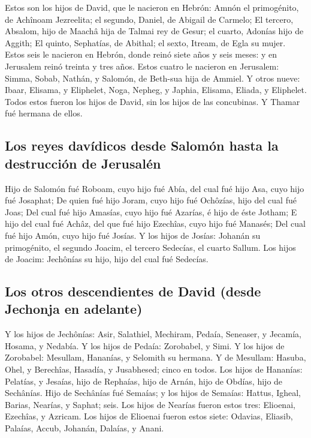  Estos son los hijos de David, que le nacieron en Hebrón:
Amnón el primogénito, de Achînoam Jezreelita; el segundo, Daniel, de
Abigail de Carmelo;  El tercero, Absalom, hijo de Maachâ
hija de Talmai rey de Gesur; el cuarto, Adonías hijo de Aggith;
 El quinto, Sephatías, de Abithal; el sexto, Itream, de
Egla su mujer.  Estos seis le nacieron en Hebrón, donde
reinó siete años y seis meses: y en Jerusalem reinó treinta y tres años.
 Estos cuatro le nacieron en Jerusalem: Simma, Sobab,
Nathán, y Salomón, de Beth-sua hija de Ammiel.  Y otros
nueve: Ibaar, Elisama, y Eliphelet,  Noga, Nepheg, y
Japhia,  Elisama, Eliada, y Eliphelet. 
Todos estos fueron los hijos de David, sin los hijos de las concubinas.
Y Thamar fué hermana de ellos.

\hypertarget{los-reyes-davuxeddicos-desde-salomuxf3n-hasta-la-destrucciuxf3n-de-jerusaluxe9n}{%
\subsection{Los reyes davídicos desde Salomón hasta la destrucción de
Jerusalén}\label{los-reyes-davuxeddicos-desde-salomuxf3n-hasta-la-destrucciuxf3n-de-jerusaluxe9n}}

 Hijo de Salomón fué Roboam, cuyo hijo fué Abía, del cual
fué hijo Asa, cuyo hijo fué Josaphat;  De quien fué hijo
Joram, cuyo hijo fué Ochôzías, hijo del cual fué Joas; 
Del cual fué hijo Amasías, cuyo hijo fué Azarías, é hijo de éste Jotham;
 E hijo del cual fué Achâz, del que fué hijo Ezechîas,
cuyo hijo fué Manasés;  Del cual fué hijo Amón, cuyo hijo
fué Josías.  Y los hijos de Josías: Johanán su
primogénito, el segundo Joacim, el tercero Sedecías, el cuarto Sallum.
 Los hijos de Joacim: Jechônías su hijo, hijo del cual
fué Sedecías.

\hypertarget{los-otros-descendientes-de-david-desde-jechonja-en-adelante}{%
\subsection{Los otros descendientes de David (desde Jechonja en
adelante)}\label{los-otros-descendientes-de-david-desde-jechonja-en-adelante}}

 Y los hijos de Jechônías: Asir, Salathiel,
 Mechiram, Pedaía, Seneaser, y Jecamía, Hosama, y
Nedabía.  Y los hijos de Pedaía: Zorobabel, y Simi. Y los
hijos de Zorobabel: Mesullam, Hananías, y Selomith su hermana.
 Y de Mesullam: Hasuba, Ohel, y Berechîas, Hasadía, y
Jusabhesed; cinco en todos.  Los hijos de Hananías:
Pelatías, y Jesaías, hijo de Rephaías, hijo de Arnán, hijo de Obdías,
hijo de Sechânías.  Hijo de Sechânías fué Semaías; y los
hijos de Semaías: Hattus, Igheal, Barias, Nearías, y Saphat; seis.
 Los hijos de Nearías fueron estos tres: Elioenai,
Ezechîas, y Azricam.  Los hijos de Elioenai fueron estos
siete: Odavias, Eliasib, Palaías, Accub, Johanán, Dalaías, y Anani.

